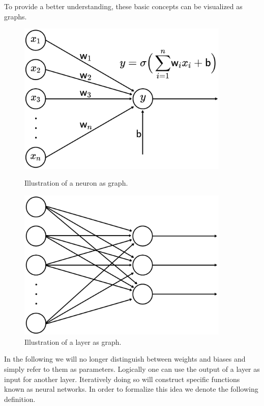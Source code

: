 \documentclass[11pt, a4paper]{article}
\begin{document}
To provide a better understanding, these basic concepts can be visualized as graphs.

\begin{figure}[!h]
\begin{minipage}[c]{0.5\textwidth}
\centering
\includegraphics[width=0.9\textwidth]{images/neuron.png}
      	\caption{Illustration of a neuron as graph.}
\end{minipage}
\begin{minipage}[c]{0.5\textwidth}
\centering
\includegraphics[width=0.9\textwidth]{images/layer.png}
      	\caption{Illustration of a layer as graph.}
\end{minipage}
\end{figure}

In the following we will no longer distinguish between weights and biases and simply refer to them as parameters. Logically one can use the output of a layer as input for another layer. Iteratively doing so will construct specific functions known as neural networks. In order to formalize this idea we denote the following definition. \\ \\
\end{document}
